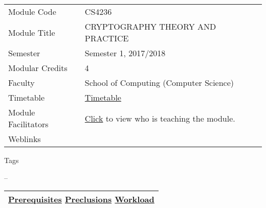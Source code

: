 \hypertarget{ctl00_ctl00_ContentPlaceHolder1_ContentPlaceHolder1_LV_itemPlaceholderContainer}{}
\begin{longtable}[]{@{}ll@{}}
\toprule
\protect\hypertarget{ctl00_ctl00_ContentPlaceHolder1_ContentPlaceHolder1_LV_ctrl0_txtCode}{}{Module
Code} &
\protect\hypertarget{ctl00_ctl00_ContentPlaceHolder1_ContentPlaceHolder1_LV_ctrl0_lcCode}{}{CS4236}\tabularnewline
\protect\hypertarget{ctl00_ctl00_ContentPlaceHolder1_ContentPlaceHolder1_LV_ctrl0_lcCourse}{}{Module
Title} &
\protect\hypertarget{ctl00_ctl00_ContentPlaceHolder1_ContentPlaceHolder1_LV_ctrl0_lcCourseName}{}{CRYPTOGRAPHY
THEORY AND PRACTICE}\tabularnewline
\protect\hypertarget{ctl00_ctl00_ContentPlaceHolder1_ContentPlaceHolder1_LV_ctrl0_lcSemester}{}{Semester}
&
\protect\hypertarget{ctl00_ctl00_ContentPlaceHolder1_ContentPlaceHolder1_LV_ctrl0_lcSem}{}{Semester
1, 2017/2018}\tabularnewline
\protect\hypertarget{ctl00_ctl00_ContentPlaceHolder1_ContentPlaceHolder1_LV_ctrl0_lcModCredit}{}{Modular
Credits} &
\protect\hypertarget{ctl00_ctl00_ContentPlaceHolder1_ContentPlaceHolder1_LV_ctrl0_lcModC}{}{4}\tabularnewline
\protect\hypertarget{ctl00_ctl00_ContentPlaceHolder1_ContentPlaceHolder1_LV_ctrl0_lcFaculty}{}{Faculty}
&
\protect\hypertarget{ctl00_ctl00_ContentPlaceHolder1_ContentPlaceHolder1_LV_ctrl0_lcFac}{}{School
of Computing (Computer Science)}\tabularnewline
\protect\hypertarget{ctl00_ctl00_ContentPlaceHolder1_ContentPlaceHolder1_LV_ctrl0_Label1}{}{Timetable}
&
\protect\hypertarget{ctl00_ctl00_ContentPlaceHolder1_ContentPlaceHolder1_LV_ctrl0_Span1}{}{\href{javascript:void(0);}{Timetable}}\tabularnewline
\protect\hypertarget{ctl00_ctl00_ContentPlaceHolder1_ContentPlaceHolder1_LV_ctrl0_Label6}{}{Module
Facilitators} &
\protect\hypertarget{ctl00_ctl00_ContentPlaceHolder1_ContentPlaceHolder1_LV_ctrl0_Span2}{}{\href{list_lecturers.aspx?CourseID=437bde8c-ff59-4ec7-9090-72689bf9434b\&ClickFrom=}{Click}
to view who is teaching the module.}\tabularnewline
\protect\hypertarget{ctl00_ctl00_ContentPlaceHolder1_ContentPlaceHolder1_LV_ctrl0_LabelCtrl1}{}{Weblinks}
&\tabularnewline
\bottomrule
\end{longtable}

\protect\hypertarget{ctl00_ctl00_ContentPlaceHolder1_ContentPlaceHolder1_LV_ctrl0_Label4}{}{Tags}

\protect\hypertarget{ctl00_ctl00_ContentPlaceHolder1_ContentPlaceHolder1_LV_ctrl0_lblTags}{}{--}

\begin{longtable}[]{@{}l@{}}
\toprule
\protect\hypertarget{ctl00_ctl00_ContentPlaceHolder1_ContentPlaceHolder1_lblSectionMiddle}{}{\protect\hyperlink{Prerequisites}{Prerequisites}
\textbar{} \protect\hyperlink{Preclusions}{Preclusions} \textbar{}
\protect\hyperlink{Workload}{Workload}}\tabularnewline
\bottomrule
\end{longtable}

